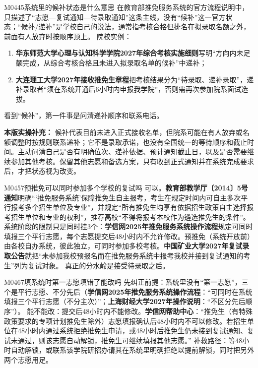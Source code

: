 \begin{qa}{M0445}{系统里的候补状态是什么意思}
在教育部推免服务系统的官方流程说明中，只描述了“志愿—复试通知—待录取通知”这条主线，没有“候补”这一官方状态；“候补/递补”是学校自己的说法，通常指考核合格但排名在拟录取名额之外，前面有人放弃时按顺序顶上。
院校实例：
\begin{enumerate}
  \item \textbf{华东师范大学心理与认知科学学院2027年综合考核实施细则}写明“方向内未足额完成，从综合考核合格且未进入拟录取名单的候补”中递补；
  \item \textbf{大连理工大学2027年接收推免生章程}把考核结果分为“待录取、递补录取”，递补录取者“须在系统开通后6小时内申报我学院”，否则需再次参加院系面试选拔。
\end{enumerate}
看到“候补”，第一件事是问清递补顺序和联系电话。
\par\textbf{本版实操补充：} 候补代表目前未进入正式接收名单，但院系可能在有人放弃或名额调整时按规则联系递补；它不是录取承诺，也没有全国统一的等待顺序和截止时间。主动问清自己是否有明确位次、递补依据、预计通知截止日，以及是否需要继续参加其他考核。保留其他志愿和备选方案，只有收到正式通知并在系统完成要求后，才把状态视为改变。
\end{qa}

\begin{qa}{M0457}{预推免可以同时参加多个学校的复试吗}
可以。\textbf{教育部教学厅〔2014〕5号通知}明确“‘推免服务系统’保障推免生自主报考，考生在规定时间内可自主多次平行报考多个招生单位及专业”，并规定“所有推免生均享有依据招生政策自主选择报考招生单位和专业的权利”，推荐高校“不得将报考本校作为遴选推免生的条件”。
系统阶段的限制只是同时挂3个：\textbf{学信网2025年推免服务系统操作流程}规定可同时填报三个平行志愿，每个志愿提交后48小时内不允许修改。预推免（系统开放前）由各校自办系统，彼此独立，可同时参加多校考核。\textbf{中国矿业大学2027年复试录取公告}就把“未参加我校预报名而在推免服务系统中报考我校并接到复试通知的考生”列为复试对象。
真正的分水岭是接受待录取之后。
\end{qa}

\begin{qa}{M0467}{填系统时第一志愿填错了能改吗}
先纠正前提：系统里没有“第一志愿”，三个是平行志愿、不分先后（\textbf{学信网2025年推免服务系统操作流程}：“可同时在系统填报三个平行志愿（不分主次）”；\textbf{上海财经大学2027年操作说明}：“不区分先后顺序”）。
能不能改：提交后48小时内不能修改。\textbf{学信网帮助中心}：“推免生（有特殊政策要求的专项计划推免生除外）志愿填报确认后48小时内不可以修改。若招生单位在48小时内通过系统拒绝推免生申请，或48小时后推免生仍未接到复试通知、复试未通过，则该志愿自动解锁，推免生可继续填报其他志愿。”
补救路径：等48小时自动解锁，或联系该学院研招办请其在系统里明确拒绝以提前解锁，同时把另外两个志愿用足。
\end{qa}


